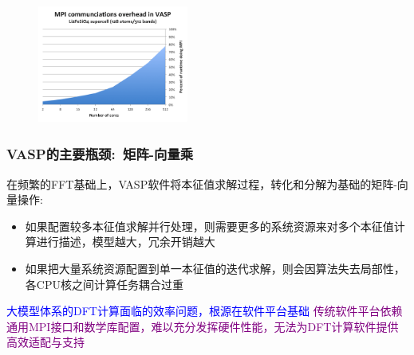 {\begin{figure}[h!]
\begin{minipage}[t]{0.49\textwidth}
\end{minipage}
\begin{minipage}[b]{0.49\textwidth}
{\fontsize{7.5pt}{5.2pt}}
\includegraphics[height=1.55in,width=1.95in,viewport=0 0 240 200,clip]{Figures/VASP-mpi-Li128.png}
\end{minipage}
\label{ABINIT_vs_VASP-3}
\end{figure} 

}

\begin{frame}
	\frametitle{\textrm{VASP}的主要瓶颈:~矩阵-向量乘}
在频繁的\textrm{FFT}基础上，\textrm{VASP}软件将本征值求解过程，转化和分解为基础的矩阵-向量操作:\\
{\fontsize{7.2pt}{5.2pt}}
	\begin{itemize}
		\item 如果配置较多本征值求解并行处理，则需要更多的系统资源来对多个本征值计算进行描述，模型越大，冗余开销越大\\
			{\fontsize{7.2pt}{5.2pt}\selectfont{可能影响软件的实用性，甚至超过了现有计算机集群的处理极限}}
		\item 如果把大量系统资源配置到单一本征值的迭代求解，则会因算法失去局部性，各\textrm{CPU}核之间计算任务耦合过重\\
	{\fontsize{7.2pt}{5.2pt}\selectfont{可能造成系统过载}}
	\end{itemize}
	{\textcolor{blue}{大模型体系的\textrm{DFT}计算面临的效率问题，根源在软件平台基础}}
	\vskip 2pt
	{\textcolor{purple}{传统软件平台依赖通用\textrm{MPI}接口和数学库配置，难以充分发挥硬件性能，无法为\textrm{DFT}计算软件提供高效适配与支持}}
\end{frame}

